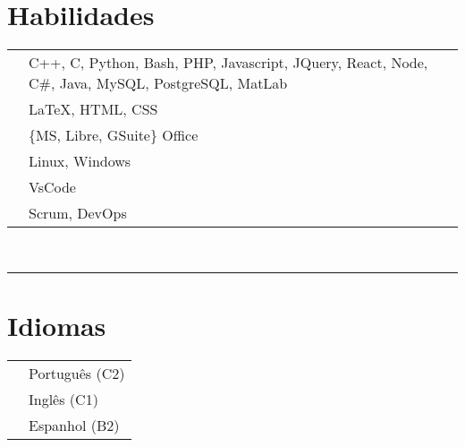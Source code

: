 \documentclass[oneside]{article}
\begin{document}
{\begin{minipage}[t][\textheight-2\fboxsep-2\fboxrule][t]{\dimexpr0.40\textwidth-2\fboxrule-2\fboxsep\relax}
        \section*{\large Habilidades}
        \begin{tabularx}{\textwidth}{cY}
            \faCode{}        & C++, C, Python, Bash, PHP, Javascript, JQuery, React, Node, C\#, Java, MySQL, PostgreSQL, MatLab \\
            \faPen*{}        & \LaTeX, HTML, CSS \\
            \faFont{}        & \{MS, Libre, GSuite\} Office \\
            \faCogs{}        & Linux, Windows \\
            \faLaptopCode{}  & VsCode \\
            \faToolbox{}     & Scrum, DevOps
        \end{tabularx}
        \vspace{1pt} \\
        \rule{\linewidth}{0.4pt}
        \section*{\large Idiomas}
        \begin{tabular}{cl}
            \faLanguage{} & Português (C2) \\
            \faLanguage{} & Inglês (C1) \\
            \faLanguage{} & Espanhol (B2) 
        \end{tabular}
        \\

    \end{minipage}
}
\hfill
\end{document}
